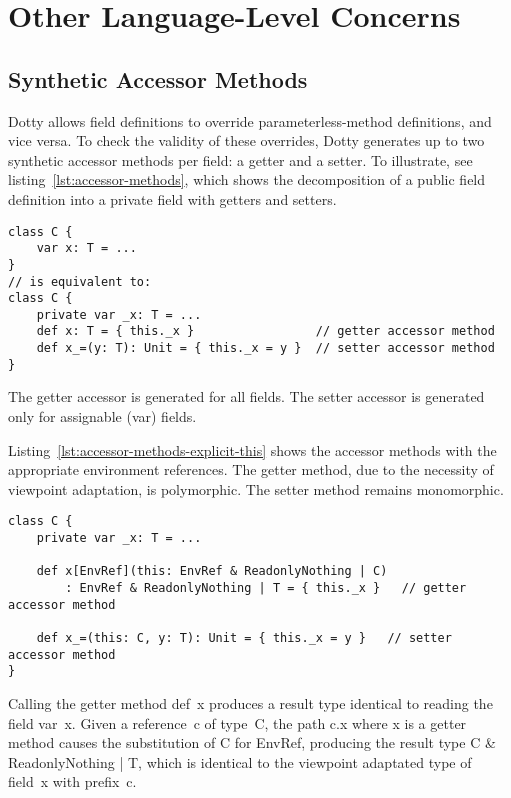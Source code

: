 \section{Other Language-Level Concerns}

\subsection{Synthetic Accessor Methods}


Dotty allows field definitions to override parameterless-method definitions, and vice versa.
To check the validity of these overrides, Dotty generates up to two synthetic accessor methods per field: a getter and a setter.
To illustrate, see listing~\ref{lst:accessor-methods}, which shows the decomposition of a public field definition into a private field with getters and setters.

\begin{lstlisting}[float=htbp, caption={Accessor Methods}, label={lst:accessor-methods}]
class C {
	var x: T = ...
}
// is equivalent to:
class C {
	private var _x: T = ...
	def x: T = { this._x }                 // getter accessor method
	def x_=(y: T): Unit = { this._x = y }  // setter accessor method
}
\end{lstlisting}

The getter accessor is generated for all fields. The setter accessor is generated only for assignable ({\cd var}) fields.

Listing~\ref{lst:accessor-methods-explicit-this} shows the accessor methods with the appropriate environment references. The getter method, due to the necessity of viewpoint adaptation, is polymorphic. The setter method remains monomorphic.

\begin{lstlisting}[float=htbp, caption={Accessor Methods (Explicit This)}, label={lst:accessor-methods-explicit-this}]
class C {
	private var _x: T = ...

	def x[EnvRef](this: EnvRef & ReadonlyNothing | C)
		: EnvRef & ReadonlyNothing | T = { this._x }   // getter accessor method

	def x_=(this: C, y: T): Unit = { this._x = y }   // setter accessor method
}
\end{lstlisting}

Calling the getter method \mbox{\cd def x} produces a result type identical to reading the field \mbox{\cd var x}.
Given a reference~{\cd c} of type~{\cd C}, the path \mbox{\cd c.x} where {\cd x} is a getter method causes the substitution of {\cd C} for {\cd EnvRef}, producing the result type
{\cd C \& ReadonlyNothing | T},
which is identical to the viewpoint adaptated type of field~{\cd x} with prefix~{\cd c}.

